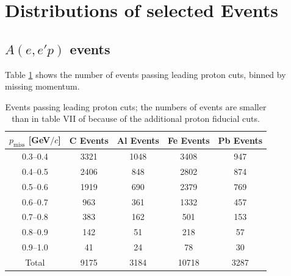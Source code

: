 \documentclass{article}
\begin{document}
\section{Distributions of selected Events}

\subsection{$A(e,e'p)$ events}

Table \ref{tab:leading} shows the number of events passing leading proton cuts, binned by missing
momentum.

\begin{table}[h]
\centering
\begin{tabular}{c c c c c}
\hline
\hline
$p_\text{miss}$ [GeV$/c$] & C Events & Al Events & Fe Events & Pb Events\\
\hline

0.3--0.4 & 3321  & 1048 & 3408 & 947  \\
0.4--0.5 & 2406  & 848  & 2802 & 874 \\
0.5--0.6 & 1919  & 690  & 2379 & 769  \\
0.6--0.7 & 963   & 361  & 1332 & 457  \\
0.7--0.8 & 383   & 162  &  501 & 153  \\
0.8--0.9 & 142   & 51   &  218 &  57 \\
0.9--1.0 & 41    & 24   &  78  &  30 \\
\hline
Total & 9175 & 3184 & 10718 & 3287 \\
\hline
\end{tabular}
\caption{\label{tab:leading} Events passing leading proton cuts; the numbers of events are smaller
than in table VII of \cite{Or:note} because of the additional proton fiducial cuts.}
\end{table}
\end{document}
